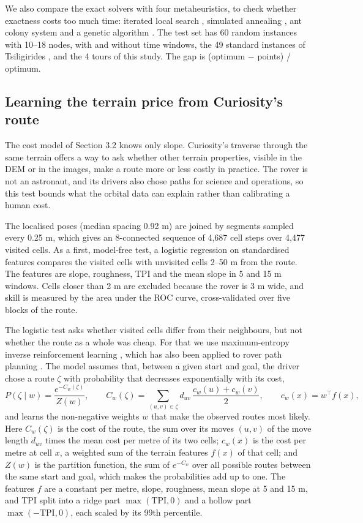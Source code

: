 \documentclass[11pt,a4paper]{article}
\begin{document}
We also compare the exact solvers with four metaheuristics, to check whether exactness costs too much time: iterated local search \cite{Vansteenwegen2009}, simulated annealing \cite{Kirkpatrick1983}, ant colony system \cite{Dorigo1997,Montemanni2009} and a genetic algorithm \cite{Tasgetiren2000}. The test set has 60 random instances with 10--18 nodes, with and without time windows, the 49 standard instances of Tsiligirides \cite{Tsiligirides1984}, and the 4 tours of this study. The gap is (optimum $-$ points) / optimum.

\subsection{Learning the terrain price from Curiosity's route}

The cost model of Section 3.2 knows only slope. Curiosity's traverse through the same terrain offers a way to ask whether other terrain properties, visible in the DEM or in the images, make a route more or less costly in practice. The rover is not an astronaut, and its drivers also chose paths for science and operations, so this test bounds what the orbital data can explain rather than calibrating a human cost.

The localised poses (median spacing 0.92 m) are joined by segments sampled every 0.25 m, which gives an 8-connected sequence of 4,687 cell steps over 4,477 visited cells. As a first, model-free test, a logistic regression on standardised features compares the visited cells with unvisited cells 2--50 m from the route. The features are slope, roughness, TPI and the mean slope in 5 and 15 m windows. Cells closer than 2 m are excluded because the rover is 3 m wide, and skill is measured by the area under the ROC curve, cross-validated over five blocks of the route.

The logistic test asks whether visited cells differ from their neighbours, but not whether the route as a whole was cheap. For that we use maximum-entropy inverse reinforcement learning \cite{Ziebart2008}, which has also been applied to rover path planning \cite{Pflueger2019}. The model assumes that, between a given start and goal, the driver chose a route $\zeta$ with probability that decreases exponentially with its cost, \[P(\zeta \mid w) = \frac{e^{-C_w(\zeta)}}{Z(w)},\qquad C_w(\zeta) = \sum_{(u,v) \in \zeta} d_{uv}\,\frac{c_w(u) + c_w(v)}{2},\qquad c_w(x) = w^\top f(x),\] and learns the non-negative weights $w$ that make the observed routes most likely. Here $C_w(\zeta)$ is the cost of the route, the sum over its moves $(u, v)$ of the move length $d_{uv}$ times the mean cost per metre of its two cells; $c_w(x)$ is the cost per metre at cell $x$, a weighted sum of the terrain features $f(x)$ of that cell; and $Z(w)$ is the partition function, the sum of $e^{-C_w}$ over all possible routes between the same start and goal, which makes the probabilities add up to one. The features $f$ are a constant per metre, slope, roughness, mean slope at 5 and 15 m, and TPI split into a ridge part $\max(\mathrm{TPI}, 0)$ and a hollow part $\max(-\mathrm{TPI}, 0)$, each scaled by its 99th percentile.
\end{document}
